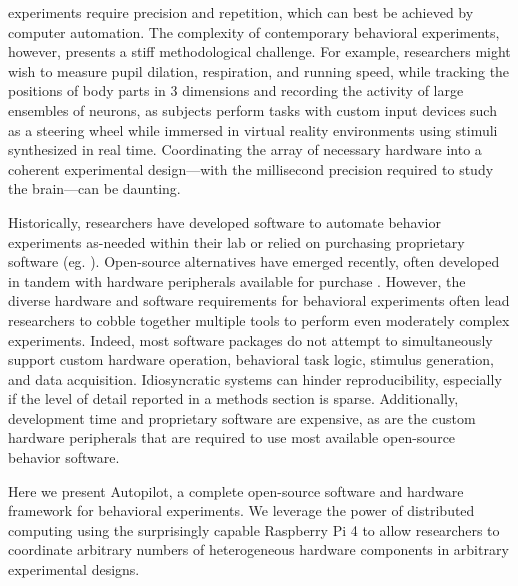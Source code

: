  experiments require precision and repetition, which can best be achieved by computer automation. The complexity of contemporary behavioral experiments, however, presents a stiff methodological challenge. For example, researchers might wish to measure pupil dilation\citep{reimerPupilFluctuationsTrack2016, reimerPupilFluctuationsTrack2016}, respiration\citep{parabuckiOdorConcentrationChange2019}, and running speed\citep{niellModulationVisualResponses2010}, while tracking the positions of body parts in 3 dimensions\citep{nathUsingDeepLabCut3D2019} and recording the activity of large ensembles of neurons\citep{junFullyIntegratedSilicon2017}, as subjects perform tasks with custom input devices such as a steering wheel\citep{burgessHighYieldMethodsAccurate2017} while immersed in virtual reality environments using stimuli synthesized in real time\citep{thurleyVirtualRealitySystems2017,chambersOnlineStimulusOptimization2014}. Coordinating the array of necessary hardware into a coherent experimental design---with the millisecond precision required to study the brain---can be daunting.

Historically, researchers have developed software to automate behavior experiments as-needed within their lab or relied on purchasing proprietary software (eg. \citep{elliottNationalInstrumentsLabVIEW2007}). Open-source alternatives have emerged recently, often developed in tandem with hardware peripherals available for purchase \citep{ephysPyControl2019,sandersSanworksBPod}. However, the diverse hardware and software requirements for behavioral experiments often lead researchers to cobble together multiple tools to perform even moderately complex experiments. Indeed, most software packages do not attempt to simultaneously support custom hardware operation, behavioral task logic, stimulus generation, and data acquisition. Idiosyncratic systems can hinder reproducibility, especially if the level of detail reported in a methods section is sparse\citep{wallReliabilityStartsExperimental2019}. Additionally, development time and proprietary software are expensive, as are the custom hardware peripherals that are required to use most available open-source behavior software.
\vspace{12pt}

Here we present Autopilot, a complete open-source software and hardware framework for behavioral experiments. We leverage the power of distributed computing using the surprisingly capable Raspberry Pi 4 to allow researchers to coordinate arbitrary numbers of heterogeneous hardware components in arbitrary experimental designs.

